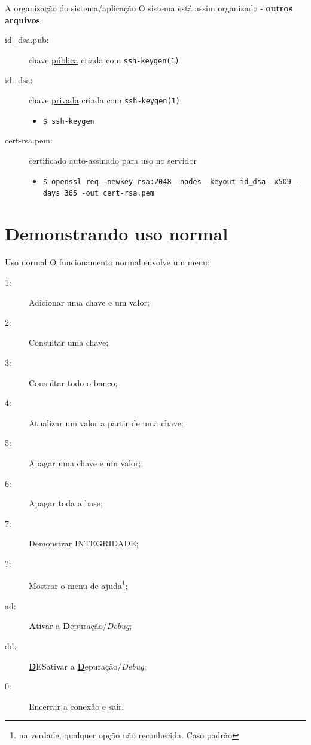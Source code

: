\documentclass[xcolor=dvipsnames,table]{beamer}
\begin{document}
\begin{frame}{A organização do sistema/aplicação}
	O sistema está assim organizado - \textbf{outros arquivos}:
	\begin{description}
		\item[id\_dsa.pub:] chave \underline{pública} criada com \texttt{ssh-keygen(1)}
		\item[id\_dsa:] chave \underline{privada} criada com \texttt{ssh-keygen(1)}
		\begin{itemize}
			\item \texttt{\$ ssh-keygen}
		\end{itemize} \pause
		
		\item[cert-rsa.pem:] certificado auto-assinado para uso no servidor
		\begin{itemize}
			\item \texttt{\$ openssl req -newkey rsa:2048 -nodes -keyout id\_dsa -x509 -days 365 -out cert-rsa.pem}
		\end{itemize}
	\end{description}
\end{frame}


\section{Demonstrando uso normal}
\begin{frame}{Uso normal}
	O funcionamento normal envolve um menu:
	\begin{description}
		\item[1:] Adicionar uma chave e um valor;
		\item[2:] Consultar uma chave;
		\item[3:] Consultar todo o banco;
		\item[4:] Atualizar um valor a partir de uma chave;
		\item[5:] Apagar uma chave e um valor;
		\item[6:] Apagar toda a base; \pause
		\item[7:] Demonstrar INTEGRIDADE; \pause
		\item[?:] Mostrar o menu de ajuda\footnote{na verdade, qualquer opção não reconhecida. Caso padrão};
		\item[ad:] \underline{\textbf{A}}tivar a \underline{\textbf{D}}epuração/\textit{Debug};
		\item[dd:] \underline{\textbf{D}}ESativar a \underline{\textbf{D}}epuração/\textit{Debug};
		\item[0:] Encerrar a conexão e sair.
	\end{description}
\end{frame}
\end{document}
